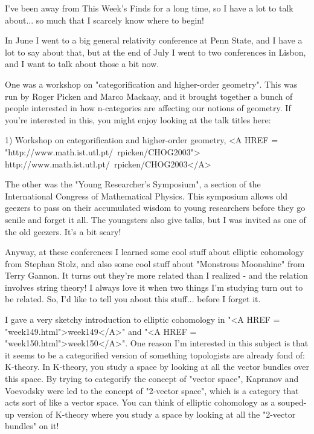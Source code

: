 


I've been away from This Week's Finds for a long time, so I have 
a lot to talk about... so much that I scarcely know where to begin!  

In June I went to a big general relativity conference at Penn State, 
and I have a lot to say about that, but at the end of July I went to 
two conferences in Lisbon, and I want to talk about those a bit now.

One was a workshop on "categorification and higher-order geometry".  
This was run by Roger Picken and Marco Mackaay, and it brought together 
a bunch of people interested in how n-categories are affecting our 
notions of geometry.  If you're interested in this, you might enjoy
looking at the talk titles here:

1) Workshop on categorification and higher-order geometry, 
<A HREF = "http://www.math.ist.utl.pt/~rpicken/CHOG2003">
http://www.math.ist.utl.pt/~rpicken/CHOG2003</A>

The other was the "Young Researcher's Symposium", a section of 
the International Congress of Mathematical Physics.  This symposium 
allows old geezers to pass on their accumulated wisdom to young 
researchers before they go senile and forget it all.  The youngsters 
also give talks, but I was invited as one of the old geezers.  It's 
a bit scary!   

Anyway, at these conferences I learned some cool stuff about 
elliptic cohomology from Stephan Stolz, and also some cool stuff 
about "Monstrous Moonshine" from Terry Gannon.  It turns out they're
more related than I realized - and the relation involves string 
theory!  I always love it when two things I'm studying turn out 
to be related.  So, I'd like to tell you about this stuff... 
before I forget it. 

I gave a very sketchy introduction to elliptic cohomology in 
"<A HREF = "week149.html">week149</A>" and "<A HREF = "week150.html">week150</A>".  One reason I'm interested in this subject 
is that it seems to be a categorified version of something topologists
are already fond of: K-theory.  In K-theory, you study a space 
by looking at all the vector bundles over this space.  By trying to
categorify the concept of "vector space", Kapranov and Voevodsky 
were led to the concept of "2-vector space", which is a category
that acts sort of like a vector space.  You can think of elliptic
cohomology as a souped-up version of K-theory where you study a
space by looking at all the "2-vector bundles" on it! 

